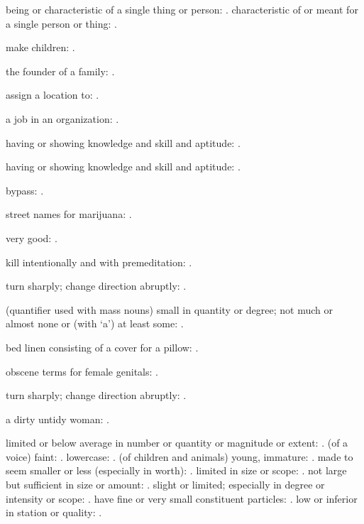   being or characteristic of a single thing or person: . characteristic of or meant for a single person or thing: .

  make children: .

  the founder of a family: .

  assign a location to: .

  a job in an organization: .

  having or showing knowledge and skill and aptitude: .

  having or showing knowledge and skill and aptitude: .

  bypass: .

  street names for marijuana: .

  very good: .

  kill intentionally and with premeditation: .

  turn sharply; change direction abruptly: .

  (quantifier used with mass nouns) small in quantity or degree; not much or almost none or (with `a') at least some: .

  bed linen consisting of a cover for a pillow: .

  obscene terms for female genitals: .

  turn sharply; change direction abruptly: .

  a dirty untidy woman: .

  limited or below average in number or quantity or magnitude or extent: . (of a voice) faint: . lowercase: . (of children and animals) young, immature: . made to seem smaller or less (especially in worth): . limited in size or scope: . not large but sufficient in size or amount: . slight or limited; especially in degree or intensity or scope: . have fine or very small constituent particles: . low or inferior in station or quality: .

